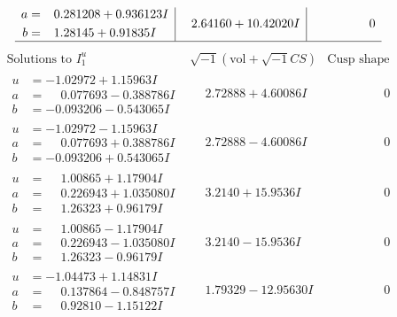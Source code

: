 \documentclass[1p]{elsarticle_modified}
\theoremstyle{definition}
\newcommand{\I}{\sqrt{-1}}
\begin{document}
$$\begin{array}{c|c|c}
\begin{aligned}
a &= \phantom{-}0.281208 + 0.936123 I \\
b &= \phantom{-}1.28145 + 0.91835 I\end{aligned}
 & \phantom{-}2.64160 + 10.42020 I & \phantom{-0.000000 } 0\\
 \hline 
 \end{array}$$\newpage$$\begin{array}{c|c|c}  
\text{Solutions to }I^u_{1}& \I (\text{vol} + \sqrt{-1}CS) & \text{Cusp shape}\\
 \hline 
\begin{aligned}
u &= -1.02972 + 1.15963 I \\
a &= \phantom{-}0.077693 - 0.388786 I \\
b &= -0.093206 - 0.543065 I\end{aligned}
 & \phantom{-}2.72888 + 4.60086 I & \phantom{-0.000000 } 0 \\ \hline\begin{aligned}
u &= -1.02972 - 1.15963 I \\
a &= \phantom{-}0.077693 + 0.388786 I \\
b &= -0.093206 + 0.543065 I\end{aligned}
 & \phantom{-}2.72888 - 4.60086 I & \phantom{-0.000000 } 0 \\ \hline\begin{aligned}
u &= \phantom{-}1.00865 + 1.17904 I \\
a &= \phantom{-}0.226943 + 1.035080 I \\
b &= \phantom{-}1.26323 + 0.96179 I\end{aligned}
 & \phantom{-}3.2140 + 15.9536 I & \phantom{-0.000000 } 0 \\ \hline\begin{aligned}
u &= \phantom{-}1.00865 - 1.17904 I \\
a &= \phantom{-}0.226943 - 1.035080 I \\
b &= \phantom{-}1.26323 - 0.96179 I\end{aligned}
 & \phantom{-}3.2140 - 15.9536 I & \phantom{-0.000000 } 0 \\ \hline\begin{aligned}
u &= -1.04473 + 1.14831 I \\
a &= \phantom{-}0.137864 - 0.848757 I \\
b &= \phantom{-}0.92810 - 1.15122 I\end{aligned}
 & \phantom{-}1.79329 - 12.95630 I & \phantom{-0.000000 } 0 \\ \hline\begin{aligned}

\end{aligned}
\end{array}$$
\end{document}
